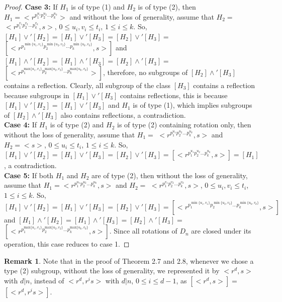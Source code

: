 \documentclass{article}
\theoremstyle{definition}
\newtheorem{remark}{Remark}
\begin{document}
\begin{proof}
\textbf{Case 3:}  If $H_1$ is of type (1) and $H_2$ is of type (2), then $H_1=\bigl<r^{p_1^{u_1}p_2^{u_2}\dots p_k^{u_k}}\bigr>$ and without the loss of generality, assume that $H_2=$ $\bigl<r^{p_1^{v_1}p_2^{v_2}\dots p_k^{v_k}},s\bigr>$, $0\le u_i,v_i\le t_i$, $1\le i\le k$. So, $[H_1]\vee' [H_2]=[H_1]\vee' [H_3]=[H_2]\vee'[H_3]=$ $[\bigl<r^{p_1^{\min\{u_1,v_1\}}p_2^{\min\{u_2,v_2\}}\dots p_k^{\min\{u_k,v_k\}}},s\bigr> ]$ and $[H_1]\wedge' [H_2]=[H_1]\wedge' [H_3]=[H_2]\wedge'[H_3]=$ $[\bigl<r^{p_1^{\text{max}\{u_1,v_1\}}p_2^{\text{max}\{u_2,v_2\}}\dots p_k^{\text{max}\{u_k,v_k\}}}\bigr> ]$, therefore, no subgroups of $[H_2]\wedge'[H_3]$ contains a reflection. Clearly, all subgroup of the class $[H_3]$ contains a reflection because subgroups in $[H_1]\vee'[H_3]$ contains reflections, this is because $[H_1]\vee' [H_2]=[H_1]\vee'[H_3]$ and $H_1$ is of type (1), which implies subgroups of $[H_2]\wedge'[H_3]$ also contains reflections, a contradiction. \vspace{0.2cm} \\
\textbf{Case 4:}  If $H_1$ is of type (2) and $H_2$ is of type (2) containing rotation only, then without the loss of generality, assume that $H_1=$ $\bigl<r^{p_1^{u_1}p_2^{u_2}\dots p_k^{u_k}},s\bigr>$ and $H_2=\bigl<s\bigr>$, $0\le u_i\le t_i$, $1\le i\le k$. So, $[H_1]\vee' [H_2]=[H_1]\vee' [H_3]=[H_2]\vee'[H_3]=[\bigl<r^{p_1^{u_1}p_2^{u_2}\dots p_k^{u_k}},s\bigr> ]=[H_1]$, a contradiction. \vspace{0.2cm}\\
\textbf{Case 5:} If both $H_1$ and $H_2$ are of type (2), then without the loss of generality, assume that $H_1=\bigl<r^{p_1^{u_1}p_2^{u_2}\dots p_k^{u_k}},s\bigr>$ and $H_2=$ $\bigl<r^{p_1^{v_1}p_2^{v_2}\dots p_k^{v_k}},s\bigr>$, $0\le u_i,v_i\le t_i$, $1\le i\le k$. So, $[H_1]\vee' [H_2]=[H_1]\vee' [H_3]=[H_2]\vee'[H_3]=[\bigl<r^{p_1^{\min\{u_1,v_1\}}p_2^{\min\{u_2,v_2\}}\dots p_k^{\min\{u_k,v_k\}}},s\bigr> ]$ and $[H_1]\wedge' [H_2]=[H_1]\wedge' [H_3]=[H_2]\wedge'[H_3]=$ $[\bigl<r^{p_1^{\text{max}\{u_1,v_1\}}p_2^{\text{max}\{u_2,v_2\}}\dots p_k^{\text{max}\{u_k,v_k\}}},s\bigr> ]$. Since all rotations of $D_n$ are closed under its operation, this case reduces to case 1. \end{proof}
\begin{remark}
    Note that in the proof of Theorem 2.7 and 2.8, whenever we chose a type (2) subgroup, without the loss of generality, we represented it by $\bigl<r^d,s\bigr>$ with $d|n$, instead of $\bigl<r^d,r^is\bigr>$ with $d|n$, $0\le i\le d-1 $, as $ [\bigl<r^d,s\bigr>]=$ $[\bigl<r^d,r^is\bigr>]$.
\end{remark}
\end{document}
